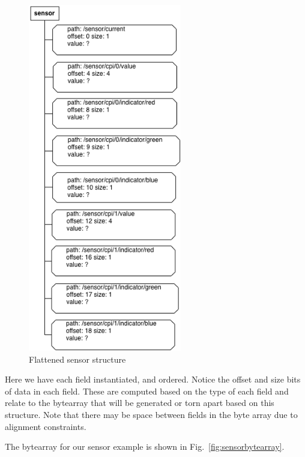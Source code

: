 \documentclass[12pt]{article}
\begin{document}
\begin{figure}[htbp] %
   \centering
   \includegraphics[height=6in]{sensor_flattened.png} 
\caption{Flattened sensor structure}
\label{fig:sensorflattened}
\end{figure}

Here we have each field instantiated, and ordered. Notice the offset
and size bits of data in each field. These are computed based on the
type of each field and relate to the bytearray that will be generated
or torn apart based on this structure. Note that there may be space
between fields in the byte array due to alignment constraints.

The bytearray for our sensor example is shown in
Fig.~\ref{fig:sensorbytearray}.
\end{document}
